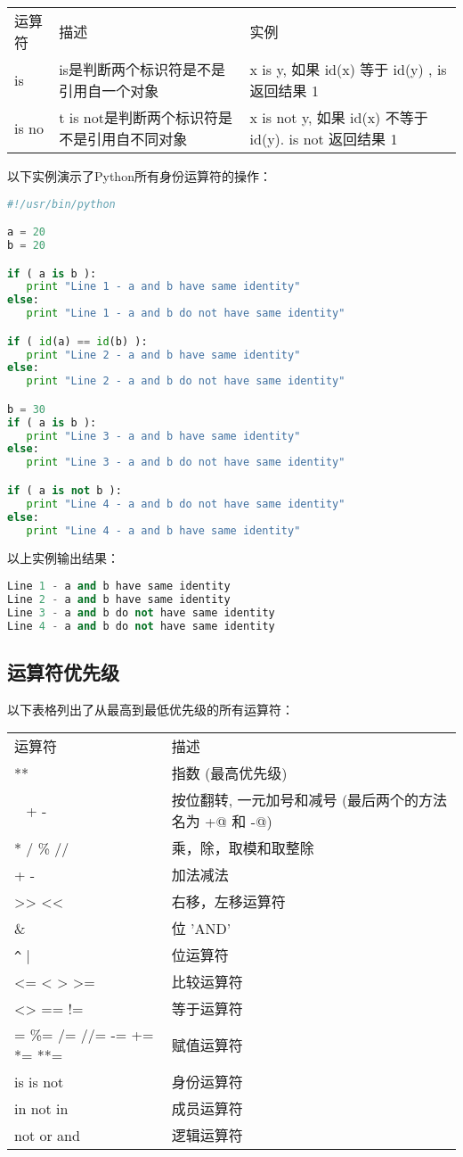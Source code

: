 \begin{tabular}{l|l|l}
运算符&	描述&	实例\\
is&	is是判断两个标识符是不是引用自一个对象	&x is y, 如果 id(x) 等于 id(y) , is 返回结果 1\\
is no&t	is not是判断两个标识符是不是引用自不同对象	&x is not y, 如果 id(x) 不等于 id(y). is not 返回结果 1
\end{tabular}
以下实例演示了Python所有身份运算符的操作：
\begin{lstlisting}[language=Python]
#!/usr/bin/python

a = 20
b = 20

if ( a is b ):
   print "Line 1 - a and b have same identity"
else:
   print "Line 1 - a and b do not have same identity"

if ( id(a) == id(b) ):
   print "Line 2 - a and b have same identity"
else:
   print "Line 2 - a and b do not have same identity"

b = 30
if ( a is b ):
   print "Line 3 - a and b have same identity"
else:
   print "Line 3 - a and b do not have same identity"

if ( a is not b ):
   print "Line 4 - a and b do not have same identity"
else:
   print "Line 4 - a and b have same identity"
\end{lstlisting}
以上实例输出结果：
\begin{lstlisting}[language=Python]
Line 1 - a and b have same identity
Line 2 - a and b have same identity
Line 3 - a and b do not have same identity
Line 4 - a and b do not have same identity 
\end{lstlisting}


\subsection{运算符优先级}
以下表格列出了从最高到最低优先级的所有运算符：

\begin{tabular}{l|l}
运算符	&描述\\
**&	指数 (最高优先级)\\
~ + -&	按位翻转, 一元加号和减号 (最后两个的方法名为 +@ 和 -@)\\
* / \% //	&乘，除，取模和取整除\\
+ -&	加法减法\\
>> <<	&右移，左移运算符\\
\&	 &位 'AND'\\
\verb|^|  | &	位运算符\\
<= < > >=	&比较运算符\\
<> == !=	&等于运算符\\
= \%= /= //= -= += *= **=	&赋值运算符\\
is is not&	身份运算符\\
in not in&	成员运算符\\
not or and&	逻辑运算符
\end{tabular}


